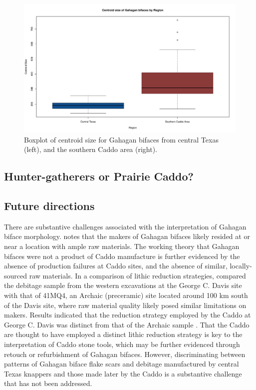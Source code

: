 \documentclass[review]{elsarticle}
\begin{document}
\begin{figure}[h]\centering
\includegraphics[width=\linewidth]{box-csize.pdf}
\caption{Boxplot of centroid size for Gahagan bifaces from central Texas (left), and the southern Caddo area (right).}
\label{fig:FigBox-CSize}
\end{figure}

\subsection*{Hunter-gatherers or Prairie Caddo?}



\subsection*{Future directions}

There are substantive challenges associated with the interpretation of Gahagan biface morphology. \citet{RN3684} notes that the makers of Gahagan bifaces likely resided at or near a location with ample raw materials. The working theory that Gahagan bifaces were not a product of Caddo manufacture is further evidenced by the absence of production failures at Caddo sites, and the absence of similar, locally-sourced raw materials. In a comparison of lithic reduction strategies, \citet{RN20701} compared the debitage sample from the western excavations at the George C. Davis site with that of 41MQ4, an Archaic (preceramic) site located around 100 km south of the Davis site, where raw material quality likely posed similar limitations on makers. Results indicated that the reduction strategy employed by the Caddo at George C. Davis was distinct from that of the Archaic sample \citep{RN20701}. That the Caddo are thought to have employed a distinct lithic reduction strategy is key to the interpretation of Caddo stone tools, which may be further evidenced through retouch or refurbishment of Gahagan bifaces. However, discriminating between patterns of Gahagan biface flake scars and debitage manufactured by central Texas knappers \citep{RN11568} and those made later by the Caddo is a substantive challenge that has not been addressed.
\end{document}
